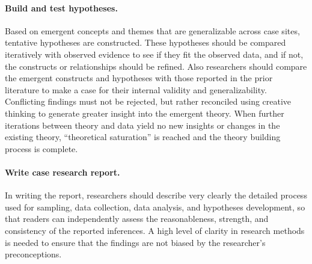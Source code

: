\paragraph{Build and test hypotheses.} Based on emergent concepts and themes that are generalizable across case sites, tentative hypotheses are constructed. These hypotheses should be compared iteratively with observed evidence to see if they fit the observed data, and if not, the constructs or relationships should be refined. Also researchers should compare the emergent constructs and hypotheses with those reported in the prior literature to make a case for their internal validity and generalizability. Conflicting findings must not be rejected, but rather reconciled using creative thinking to generate greater insight into the emergent theory. When further iterations between theory and data yield no new insights or changes in the existing theory, ``theoretical saturation'' is reached and the theory building process is complete.

\paragraph{Write case research report.} In writing the report, researchers should describe very clearly the detailed process used for sampling, data collection, data analysis, and hypotheses development, so that readers can independently assess the reasonableness, strength, and consistency of the reported inferences. A high level of clarity in research methods is needed to ensure that the findings are not biased by the researcher's preconceptions.


